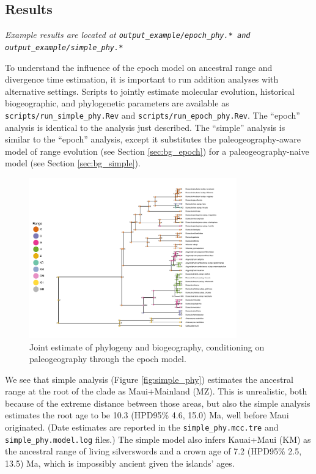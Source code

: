 \subsection{Results}

\begin{center}
{\it Example results are located at \tt{output\_example/epoch\_phy.*} and \tt{output\_example/simple\_phy.*} }
\end{center}

To understand the influence of the epoch model on ancestral range and divergence time estimation, it is important to run addition analyses with alternative settings.
Scripts to jointly estimate molecular evolution, historical biogeographic, and phylogenetic parameters are available as {\tt scripts/run\_simple\_phy.Rev} and {\tt scripts/run\_epoch\_phy.Rev}.
The ``epoch'' analysis is identical to the analysis just described.
The ``simple'' analysis is similar to the ``epoch'' analysis, except it substitutes the paleogeography-aware model of range evolution (see Section \ref{sec:bg_epoch}) for a paleogeography-naive model (see Section \ref{sec:bg_simple}).

\begin{figure}[!h]
\centering
\includegraphics[width=0.8\textwidth]{figures/fig_epoch_phy_RevGadgets_ase.pdf} 
\caption{Joint estimate of phylogeny and biogeography, conditioning on paleogeography through the epoch model.}
\label{fig:epoch_phy}
\end{figure}

We see that simple analysis (Figure \ref{fig:simple_phy}) estimates the ancestral range at the root of the clade as Maui+Mainland (MZ).
This is unrealistic, both because of the extreme distance between those areas, but also the simple analysis estimates the root age to be 10.3 (HPD95\% 4.6, 15.0) Ma, well before Maui originated.
(Date estimates are reported in the {\tt simple\_phy.mcc.tre} and {\tt simple\_phy.model.log} files.)
The simple model also infers Kauai+Maui (KM) as the ancestral range of living silverswords and a crown age of 7.2 (HPD95\% 2.5, 13.5) Ma, which is impossibly ancient given the islands' ages.

